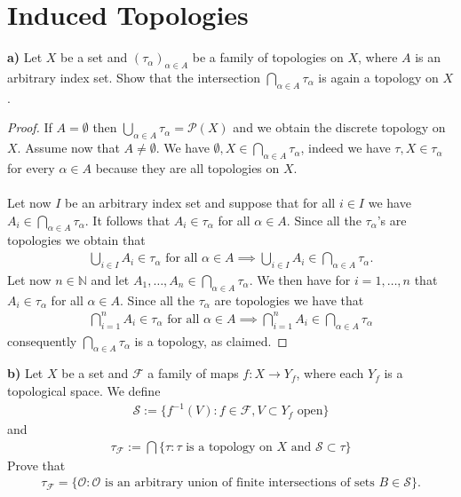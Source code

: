 \documentclass[12pt,a4paper]{article}
\begin{document}
\section{Induced Topologies}
\textbf{a)} Let $X$ be a set and $(\tau_\alpha)_{ \alpha \in A}$ be a family of topologies on $X$, where $A$ is an arbitrary index set. Show that the intersection $\bigcap_{ \alpha \in A} \tau_\alpha$ is again a topology on $X$. 
\begin{proof}
If $A=\emptyset$ then $\bigcup_{\alpha \in A} \tau_\alpha = \mathcal{P}(X)$ and we obtain the discrete topology on $X$. Assume now that $A \neq \emptyset$. We have $\emptyset, X \in \bigcap_{ \alpha \in A} \tau_\alpha$, indeed we have $\tau, X \in \tau_\alpha$ for every $\alpha \in A$ because they are all topologies on $X$. 
\\\\
Let now $I$ be an arbitrary index set and suppose that for all $i \in I$ we have $A_i \in \bigcap_{ \alpha \in A} \tau_\alpha$. It follows that $A_i \in \tau_\alpha$ for all $\alpha \in A$. Since all the $\tau_\alpha$'s are topologies we obtain that \begin{align*}
\bigcup_{i \in I} A_i \in \tau_\alpha \text{ for all } \alpha \in A \implies \bigcup_{i \in I } A_i \in \bigcap_{ \alpha \in A} \tau_\alpha.
\end{align*}
Let now $n \in \mathbb{N}$ and let $A_1, \dots , A_n \in \bigcap_{ \alpha \in A} \tau_\alpha$. We then have for $i=1,\dots ,n$ that $A_i \in \tau_\alpha$ for all $\alpha \in A$. Since all the $\tau_\alpha$ are topologies we have that 
\begin{align*}
\bigcap_{i=1}^n A_i \in \tau_\alpha \text{ for all } \alpha \in A \implies \bigcap_{i=1}^n A_i \in \bigcap_{ \alpha \in A} \tau_\alpha
\end{align*}
consequently $\bigcap_{ \alpha \in A} \tau_\alpha$ is a topology, as claimed. 
\end{proof}
\noindent \textbf{b)} Let $X$ be a set and $\mathcal{F}$ a family of maps $f:X \to Y_f$, where each $Y_f$ is a topological space. We define
\begin{align*}
\mathcal{S}:= \lbrace f^{-1}(V): f \in \mathcal{F}, V \subset Y_f \text{ open} \rbrace 
\end{align*}
and
\begin{align*}
\tau_{\mathcal{F}} := \bigcap \lbrace \tau : \tau \text{ is a topology on $X$ and } \mathcal{S} \subset \tau \rbrace 
\end{align*}
Prove that 
\begin{align*}
\tau_{\mathcal{F}} = \lbrace \mathcal{O}: \mathcal{O} \text{ is an arbitrary union of finite intersections of sets } B \in \mathcal{S} \rbrace. 
\end{align*}
\end{document}

